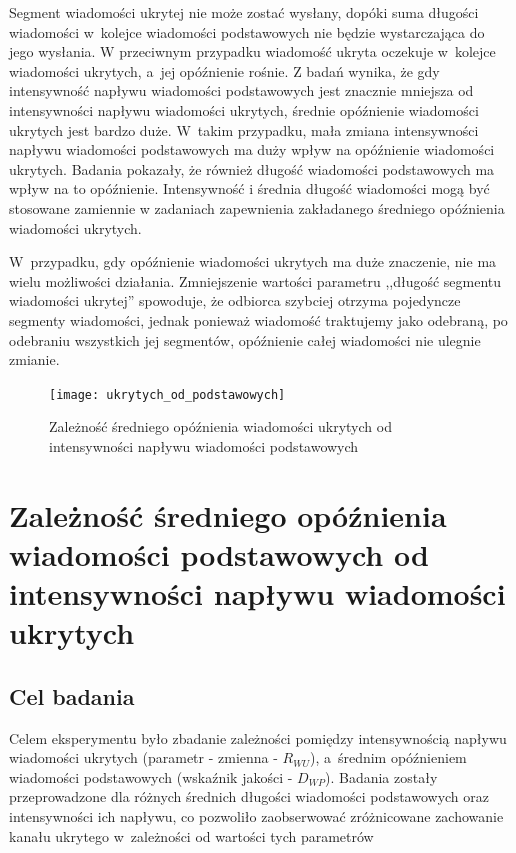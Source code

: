\documentclass[a4paper, twoside, 12pt]{report}
\begin{document}
            Segment wiadomości ukrytej nie może zostać wysłany, dopóki suma długości
            wiadomości w~kolejce wiadomości podstawowych nie będzie wystarczająca do jego wysłania.
            W przeciwnym przypadku wiadomość ukryta oczekuje w~kolejce wiadomości
            ukrytych, a~jej opóźnienie rośnie. Z badań wynika, że gdy intensywność
            napływu wiadomości podstawowych jest znacznie mniejsza od intensywności
            napływu wiadomości ukrytych, średnie opóźnienie wiadomości ukrytych jest
            bardzo duże. W~takim przypadku, mała zmiana intensywności napływu wiadomości
            podstawowych ma duży wpływ na opóźnienie wiadomości ukrytych. Badania
            pokazały, że również długość wiadomości podstawowych ma wpływ na to opóźnienie.
            Intensywność i średnia długość wiadomości mogą być stosowane zamiennie
            w zadaniach zapewnienia zakładanego średniego opóźnienia wiadomości ukrytych.

            W~przypadku, gdy opóźnienie wiadomości ukrytych ma duże znaczenie,
            nie ma wielu możliwości działania. Zmniejszenie wartości parametru ,,długość
            segmentu wiadomości ukrytej'' spowoduje, że odbiorca szybciej otrzyma
            pojedyncze segmenty wiadomości, jednak ponieważ wiadomość traktujemy jako odebraną,
            po odebraniu wszystkich jej segmentów, opóźnienie całej wiadomości
            nie ulegnie zmianie.

        \begin{figure}[h]
                \centering
                \texttt{[image: ukrytych\_od\_podstawowych]}
                \caption{Zależność średniego opóźnienia wiadomości ukrytych od
                    intensywności napływu wiadomości podstawowych}
                \label{OPOZNIENIEUKRYTYCHODPODSTAWOWYCH}
        \end{figure}

    \section{Zależność średniego opóźnienia wiadomości podstawowych od intensywności napływu wiadomości ukrytych} \label{OPOZNIENEPODSTAWOWYCHODUKRYTYCH}
        \subsection{Cel badania}
            Celem eksperymentu było zbadanie zależności pomiędzy intensywnością
            napływu wiadomości ukrytych (parametr - zmienna - \( R_{WU} \)), a~średnim opóźnieniem wiadomości podstawowych (wskaźnik jakości - \( D_{WP} \)).
            Badania zostały przeprowadzone dla różnych średnich długości wiadomości
            podstawowych oraz intensywności ich napływu, co pozwoliło zaobserwować
            zróżnicowane zachowanie kanału ukrytego w~zależności od wartości tych
            parametrów
\end{document}
